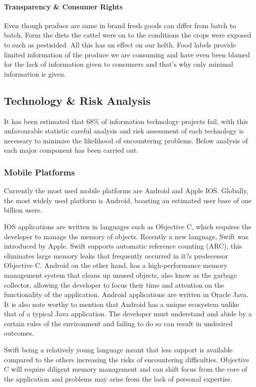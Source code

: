 \documentclass[a4paper, 11pt]{article}
\begin{document}
\paragraph{Transparency \& Consumer Rights} Even though producs are same in brand fresh goods can differ from batch to batch. Form the diets the cattel were on to the conditions the crops were exposed to such as pestisided. All this has an effect on our helth.
Food labels provide limited information of the produce we are consuming and have even been blamed for the lack of information given to consumers and that's why only minimal information is given.  

\subsection{Technology \& Risk Analysis}
It has been estimated that 68\% of information technology projects fail, with this unfavourable statistic careful analysis and risk assessment of each technology is necessary to minimise the likelihood of encountering problems. Below analysis of each major component has been carried out.

\subsubsection{Mobile Platforms}
Currently the most used mobile platforms are Android and Apple IOS. Globally, the most widely used platform is Android, boasting an estimated user base of one billion users. 

IOS applications are written in languages such as Objective C, which requires the developer to manage the memory of objects. Recently a new language, Swift was introduced by Apple. Swift supports automatic reference counting (ARC), this eliminates large memory leaks that frequently occurred in it?s predecessor Objective C. Android on the other hand, has a high-performance memory management system that cleans up unused objects, also know as the garbage collector, allowing the developer to focus their time and attention on the functionality of the application. Android applications are written in Oracle Java. It is also note worthy to mention that Android has a unique ecosystem unlike that of a typical Java application. The developer must understand and abide by a certain rules of the environment and failing to do so can result in undesired outcomes. 

Swift being a relatively young language meant that less support is available compared to the others increasing the risks of encountering difficulties. Objective C will require diligent memory management and can shift focus from the core of the application and problems may arise from the lack of personal expertise.
\end{document}
